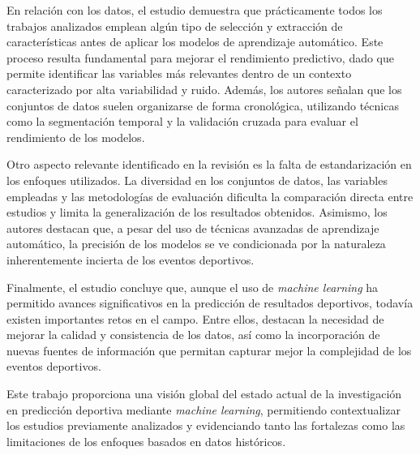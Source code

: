 En relación con los datos, el estudio demuestra que prácticamente todos los trabajos analizados emplean algún tipo de selección y extracción de características antes de aplicar los modelos de aprendizaje automático. Este proceso resulta fundamental para mejorar el rendimiento predictivo, dado que permite identificar las variables más relevantes dentro de un contexto caracterizado por alta variabilidad y ruido. Además, los autores señalan que los conjuntos de datos suelen organizarse de forma cronológica, utilizando técnicas como la segmentación temporal y la validación cruzada para evaluar el rendimiento de los modelos.

Otro aspecto relevante identificado en la revisión es la falta de estandarización en los enfoques utilizados. La diversidad en los conjuntos de datos, las variables empleadas y las metodologías de evaluación dificulta la comparación directa entre estudios y limita la generalización de los resultados obtenidos. Asimismo, los autores destacan que, a pesar del uso de técnicas avanzadas de aprendizaje automático, la precisión de los modelos se ve condicionada por la naturaleza inherentemente incierta de los eventos deportivos.

Finalmente, el estudio concluye que, aunque el uso de \textit{machine learning} ha permitido avances significativos en la predicción de resultados deportivos, todavía existen importantes retos en el campo. Entre ellos, destacan la necesidad de mejorar la calidad y consistencia de los datos, así como la incorporación de nuevas fuentes de información que permitan capturar mejor la complejidad de los eventos deportivos.

Este trabajo proporciona una visión global del estado actual de la investigación en predicción deportiva mediante \textit{machine learning}, permitiendo contextualizar los estudios previamente analizados y evidenciando tanto las fortalezas como las limitaciones de los enfoques basados en datos históricos.

